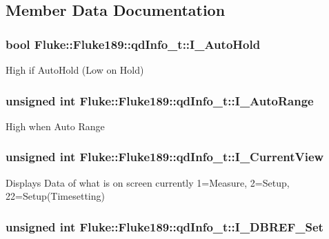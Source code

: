 \subsection{Member Data Documentation}
\hypertarget{structFluke_1_1Fluke189_1_1qdInfo__t_ac3847dd0cc0cf882a6ceefb14234ee81}{
\subsubsection[{I\_\-AutoHold}]{\setlength{\rightskip}{0pt plus 5cm}bool {\bf Fluke::Fluke189::qdInfo\_\-t::I\_\-AutoHold}}}
\label{structFluke_1_1Fluke189_1_1qdInfo__t_ac3847dd0cc0cf882a6ceefb14234ee81}
High if AutoHold (Low on Hold) \hypertarget{structFluke_1_1Fluke189_1_1qdInfo__t_a70bb64e7e52b6b8fdb584878f9ef4b2a}{
\subsubsection[{I\_\-AutoRange}]{\setlength{\rightskip}{0pt plus 5cm}unsigned int {\bf Fluke::Fluke189::qdInfo\_\-t::I\_\-AutoRange}}}
\label{structFluke_1_1Fluke189_1_1qdInfo__t_a70bb64e7e52b6b8fdb584878f9ef4b2a}
High when Auto Range \hypertarget{structFluke_1_1Fluke189_1_1qdInfo__t_a6e80fb52d719bdf696fe23628ece9fdb}{
\subsubsection[{I\_\-CurrentView}]{\setlength{\rightskip}{0pt plus 5cm}unsigned int {\bf Fluke::Fluke189::qdInfo\_\-t::I\_\-CurrentView}}}
\label{structFluke_1_1Fluke189_1_1qdInfo__t_a6e80fb52d719bdf696fe23628ece9fdb}
Displays Data of what is on screen currently 1=Measure, 2=Setup, 22=Setup(Timesetting) \hypertarget{structFluke_1_1Fluke189_1_1qdInfo__t_ae4c25629fcefa361ba142764eb5bffdf}{
\subsubsection[{I\_\-DBREF\_\-Set}]{\setlength{\rightskip}{0pt plus 5cm}unsigned int {\bf Fluke::Fluke189::qdInfo\_\-t::I\_\-DBREF\_\-Set}}}
